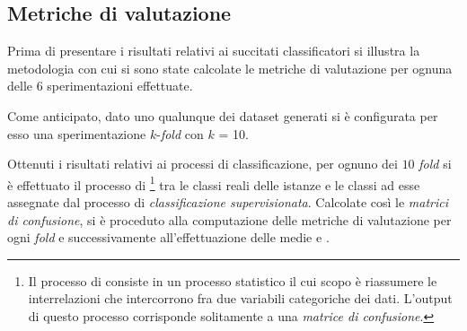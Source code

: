 \subsection{Metriche di valutazione}
Prima di presentare i risultati relativi ai succitati classificatori si illustra la metodologia con cui si sono state calcolate le metriche di valutazione per ognuna delle $6$ sperimentazioni effettuate.

Come anticipato, dato uno qualunque dei dataset generati si è configurata per esso una sperimentazione $k$-\emph{fold } con $k$ = 10.

Ottenuti i risultati relativi ai processi di classificazione, per ognuno dei $10$ \emph{fold} si è effettuato il processo di \emph{}\footnote{Il processo di  consiste in un processo statistico il cui scopo è riassumere le interrelazioni che intercorrono fra due variabili categoriche dei dati. L'output di questo processo corrisponde solitamente a una \emph{matrice di confusione}.} tra le classi reali delle istanze e le classi ad esse assegnate dal processo di \emph{classificazione supervisionata}. Calcolate così le \emph{matrici di confusione}, si è proceduto alla computazione delle metriche di valutazione per ogni \emph{fold} e successivamente all'effettuazione delle medie \emph{} e \emph{}.

